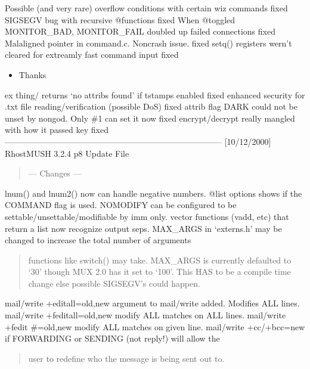 \documentclass[letterpaper,10pt,english]{sphinxmanual}
\begin{document}
\sphinxAtStartPar
Possible (and very rare) overflow conditions with certain wiz commands \sphinxhyphen{} fixed
SIGSEGV bug with recursive @functions \sphinxhyphen{} fixed
When @toggled MONITOR\_BAD, MONITOR\_FAIL doubled up failed connections \sphinxhyphen{} fixed
Malaligned pointer in command.c.  Non\sphinxhyphen{}crash issue.  \sphinxhyphen{} fixed
setq() registers wern’t cleared for extreamly fast command input \sphinxhyphen{} fixed
\begin{itemize}
\item {} 
\sphinxAtStartPar
Thanks 

\end{itemize}

\sphinxAtStartPar
ex thing/ returns ‘no attribs found’ if tstamps enabled \sphinxhyphen{} fixed
enhanced security for .txt file reading/verification (possible DoS) \sphinxhyphen{} fixed
attrib flag DARK could not be unset by non\sphinxhyphen{}god.  Only \#1 can set it now \sphinxhyphen{} fixed
encrypt/decrypt really mangled with how it passed key \sphinxhyphen{} fixed
——————————————————————————\textendash{}
{[}10/12/2000{]}             RhostMUSH 3.2.4 p8 Update File
\begin{quote}

\sphinxAtStartPar
—\sphinxhyphen{} Changes —\sphinxhyphen{}
\end{quote}

\sphinxAtStartPar
lnum() and lnum2() now can handle negative numbers.
@list options shows if the COMMAND flag is used.
NOMODIFY can be configured to be settable/unsettable/modifiable by imm only.
vector functions (vadd, etc) that return a list now recognize output seps.
MAX\_ARGS in ‘externs.h’ may be changed to increase the total number of arguments
\begin{quote}

\sphinxAtStartPar
functions like switch() may take.  MAX\_ARGS is currently defaulted to
‘30’ though MUX 2.0 has it set to ‘100’.  This HAS to be a compile
time change else possible SIGSEGV’s could happen.
\end{quote}

\sphinxAtStartPar
mail/write +editall=old,new \sphinxhyphen{} argument to mail/write added. Modifies ALL lines.
mail/write +feditall=old,new \sphinxhyphen{} modify ALL matches on ALL lines.
mail/write +fedit \#=old,new \sphinxhyphen{} modify ALL matches on given line.
mail/write +cc/+bcc=new \sphinxhyphen{} if FORWARDING or SENDING (not reply!) will allow the
\begin{quote}

\sphinxAtStartPar
user to redefine who the message is being sent out to.
\end{quote}
\end{document}
